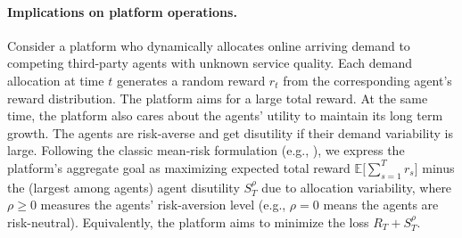 \documentclass[nonblindrev]{informs3_noinforms}
\begin{document}
\paragraph{Implications on platform operations.} {Consider a platform who dynamically allocates online arriving demand to competing third-party agents with unknown service quality. Each demand allocation at time $t$ generates a random reward $r_t$ from the corresponding agent's reward distribution. The platform aims for a large total reward. At the same time, the platform also cares about the agents' utility to maintain its long term growth. The agents are risk-averse and get disutility if their demand variability is large. Following the classic mean-risk formulation (e.g., \cite{markowitz1952portfolio}), we express the platform's aggregate goal as maximizing expected total reward $\mathbb E\big[\sum_{s=1}^T r_s\big]$ minus the (largest among agents) agent disutility $S_T^\rho$ due to allocation variability, where $\rho\geq 0$ measures the agents' risk-aversion level (e.g., $\rho=0$ means the agents are risk-neutral). Equivalently, the platform aims to minimize the loss $R_T +S_T^\rho$.

}
\end{document}
